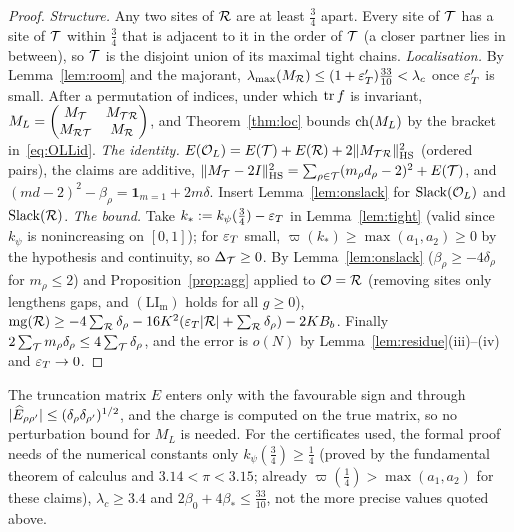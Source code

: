 \begin{proof}
\emph{Structure.} Any two sites of $\mathcal R$ are at least $\frac34$ apart. Every site of $\mathcal T$ has a site of $\mathcal T$ within $\frac34$ that is adjacent to it in
the order of $\mathcal T$ (a closer partner lies in between), so $\mathcal T$ is the disjoint union of its maximal tight chains.
\emph{Localisation.} By Lemma~\ref{lem:room} and the majorant, $\lambda_{\max}(M_\mathcal R)\le(1+\varepsilon'_T)\frac{33}{10}<\lambda_c$ once $\varepsilon'_T$ is small. After a permutation of indices, under which
$\operatorname{tr} f$ is invariant, $M_L=\begin{pmatrix}M_\mathcal T&M_{\mathcal T\mathcal R}\\M_{\mathcal R\mathcal T}&M_\mathcal R\end{pmatrix}$, and Theorem~\ref{thm:loc} bounds $\operatorname{ch}(M_L)$ by the bracket
in~\eqref{eq:OLLid}.
\emph{The identity.} $E(\mathcal O_L)=E(\mathcal T)+E(\mathcal R)+2\lVert M_{\mathcal T\mathcal R}\rVert_{\mathrm{HS}}^2$ (ordered pairs), the claims are additive, $\lVert M_\mathcal T-2I\rVert_{\mathrm{HS}}^2=\sum_{\rho\in\mathcal T}(m_\rho d_\rho-2)^2+E(\mathcal T)$,
and $(md-2)^2-\beta_\rho=\mathbf1_{m=1}+2m\delta$. Insert Lemma~\ref{lem:onslack} for $\operatorname{Slack}(\mathcal O_L)$ and $\operatorname{Slack}(\mathcal R)$.
\emph{The bound.} Take $k_*:=k_\psi(\frac34)-\varepsilon_T$ in Lemma~\ref{lem:tight} (valid since $k_\psi$ is nonincreasing on $[0,1]$); for $\varepsilon_T$
small, $\varpi(k_*)\ge\max(a_1,a_2)\ge0$ by the hypothesis and continuity, so $\Delta_\mathcal T\ge0$. By Lemma~\ref{lem:onslack} ($\beta_\rho\ge-4\delta_\rho$
for $m_\rho\le2$) and Proposition~\ref{prop:agg} applied to $\mathcal O=\mathcal R$ (removing sites only lengthens gaps, and $(\mathrm{LI}_{\mathrm m})$ holds for all
$g\ge0$), $\operatorname{mg}(\mathcal R)\ge-4\sum_\mathcal R\delta_\rho-16K^2(\varepsilon_T\lvert \mathcal R\rvert+\sum_\mathcal R\delta_\rho)-2KB_b$. Finally $2\sum_\mathcal T m_\rho\delta_\rho\le4\sum_\mathcal T\delta_\rho$,
and the error is $o(N)$ by Lemma~\ref{lem:residue}(iii)--(iv) and $\varepsilon_T\to0$.
\end{proof}

The truncation matrix $\widehat E$ enters only with the favourable sign and through $\lvert \widehat E_{\rho\rho'}\rvert\le(\delta_\rho\delta_{\rho'})^{1/2}$, and
the charge is computed on the true matrix, so no perturbation bound for $M_L$ is needed. For the certificates used, the formal proof needs of
the numerical constants only $k_\psi(\frac34)\ge\frac14$ (proved by the fundamental theorem of calculus and $3.14<\pi<3.15$; already $\varpi(\frac14)>\max(a_1,a_2)$
for these claims), $\lambda_c\ge3.4$ and $2\beta_0+4\beta_*\le\frac{33}{10}$, not the more precise values quoted above.

